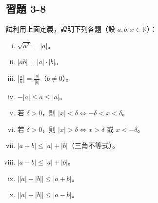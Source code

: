 \subsection*{習題 3-8}\label{sec:ex3-8}

試利用上面定義，證明下列各題（設 $a, b, x \in \mathbb{R}$）：
\begin{enumerate}[(i), leftmargin=2.5em]
  \item $\sqrt{a^2} = |a|$。
  \item $|ab| = |a| \cdot |b|$。
  \item $\left|\frac{a}{b}\right| = \frac{|a|}{|b|}$（$b \neq 0$）。
  \item $-|a| \le a \le |a|$。
  \item 若 $\delta > 0$，則 $|x| < \delta \iff -\delta < x < \delta$。
  \item 若 $\delta > 0$，則 $|x| > \delta \iff x > \delta$ 或 $x < -\delta$。
  \item $|a+b| \le |a| + |b|$（三角不等式）。
  \item $|a-b| \le |a| + |b|$。
  \item $\big||a| - |b|\big| \le |a+b|$。
  \item $\big||a| - |b|\big| \le |a-b|$。
\end{enumerate}
